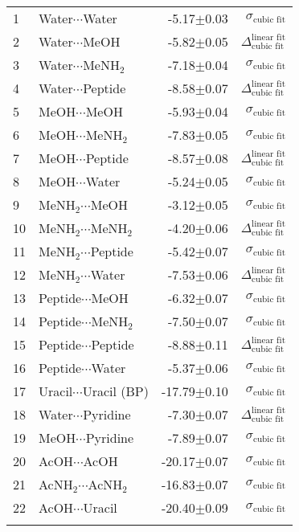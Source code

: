 \begin{longtable}{llrr}
1 & Water$\cdots$Water & -5.17$\pm$0.03 & $\sigma_\text{cubic fit}$ \\
2 & Water$\cdots$MeOH & -5.82$\pm$0.05 & $\Delta_\text{cubic fit}^\text{linear fit}$ \\
3 & Water$\cdots$MeNH$_2$ & -7.18$\pm$0.04 & $\sigma_\text{cubic fit}$ \\
4 & Water$\cdots$Peptide & -8.58$\pm$0.07 & $\Delta_\text{cubic fit}^\text{linear fit}$ \\
5 & MeOH$\cdots$MeOH & -5.93$\pm$0.04 & $\sigma_\text{cubic fit}$ \\
6 & MeOH$\cdots$MeNH$_2$ & -7.83$\pm$0.05 & $\sigma_\text{cubic fit}$ \\
7 & MeOH$\cdots$Peptide & -8.57$\pm$0.08 & $\Delta_\text{cubic fit}^\text{linear fit}$ \\
8 & MeOH$\cdots$Water & -5.24$\pm$0.05 & $\sigma_\text{cubic fit}$ \\
9 & MeNH$_2$$\cdots$MeOH & -3.12$\pm$0.05 & $\sigma_\text{cubic fit}$ \\
10 & MeNH$_2$$\cdots$MeNH$_2$ & -4.20$\pm$0.06 & $\Delta_\text{cubic fit}^\text{linear fit}$ \\
11 & MeNH$_2$$\cdots$Peptide & -5.42$\pm$0.07 & $\sigma_\text{cubic fit}$ \\
12 & MeNH$_2$$\cdots$Water & -7.53$\pm$0.06 & $\Delta_\text{cubic fit}^\text{linear fit}$ \\
13 & Peptide$\cdots$MeOH & -6.32$\pm$0.07 & $\sigma_\text{cubic fit}$ \\
14 & Peptide$\cdots$MeNH$_2$ & -7.50$\pm$0.07 & $\sigma_\text{cubic fit}$ \\
15 & Peptide$\cdots$Peptide & -8.88$\pm$0.11 & $\Delta_\text{cubic fit}^\text{linear fit}$ \\
16 & Peptide$\cdots$Water & -5.37$\pm$0.06 & $\sigma_\text{cubic fit}$ \\
17 & Uracil$\cdots$Uracil (BP) & -17.79$\pm$0.10 & $\sigma_\text{cubic fit}$ \\
18 & Water$\cdots$Pyridine & -7.30$\pm$0.07 & $\Delta_\text{cubic fit}^\text{linear fit}$ \\
19 & MeOH$\cdots$Pyridine & -7.89$\pm$0.07 & $\sigma_\text{cubic fit}$ \\
20 & AcOH$\cdots$AcOH & -20.17$\pm$0.07 & $\sigma_\text{cubic fit}$ \\
21 & AcNH$_2$$\cdots$AcNH$_2$ & -16.83$\pm$0.07 & $\sigma_\text{cubic fit}$ \\
22 & AcOH$\cdots$Uracil & -20.40$\pm$0.09 & $\sigma_\text{cubic fit}$ \\
$$
\end{longtable}
